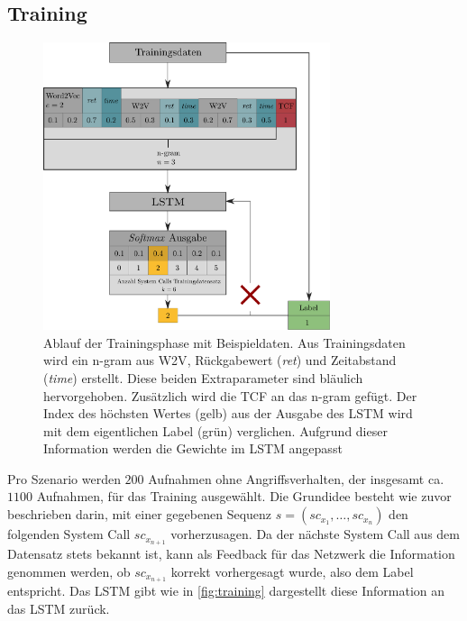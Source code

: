         \subsection{Training}\label{sec:Training}
            \begin{figure}
                \centering
                \includegraphics[width=0.75\textwidth]{images/Process_overview.pdf}
                \caption[Algorithmus - Ablauf Trainingsphase]{Ablauf der Trainingsphase mit Beispieldaten.
                        Aus Trainingsdaten wird ein n-gram aus \ac{W2V}, Rückgabewert (\textit{ret}) und Zeitabstand (\textit{time}) erstellt.
                        Diese beiden Extraparameter sind bläulich hervorgehoben.
                        Zusätzlich wird die \ac{TCF} an das n-gram gefügt.
                        Der Index des höchsten Wertes (gelb) aus der Ausgabe des \ac{LSTM} wird mit dem eigentlichen Label (grün) verglichen.
                        Aufgrund dieser Information werden die Gewichte im \ac{LSTM} angepasst}\label{fig:training}
            \end{figure}
            Pro Szenario werden $200$ Aufnahmen ohne Angriffsverhalten, der insgesamt ca.\ $1100$ Aufnahmen, für das Training ausgewählt.
            Die Grundidee besteht wie zuvor beschrieben darin, mit einer gegebenen Sequenz $s = (sc_{x_1},\dots,sc_{x_n})$ den folgenden System Call $sc_{x_{n+1}}$ vorherzusagen. 
            Da der nächste System Call aus dem Datensatz stets bekannt ist, kann als Feedback für das Netzwerk die Information genommen werden, ob $sc_{x_{n+1}}$ korrekt vorhergesagt wurde, also dem Label entspricht.
            Das \ac{LSTM} gibt wie in \autoref{fig:training} dargestellt diese Information an das \ac{LSTM} zurück.

